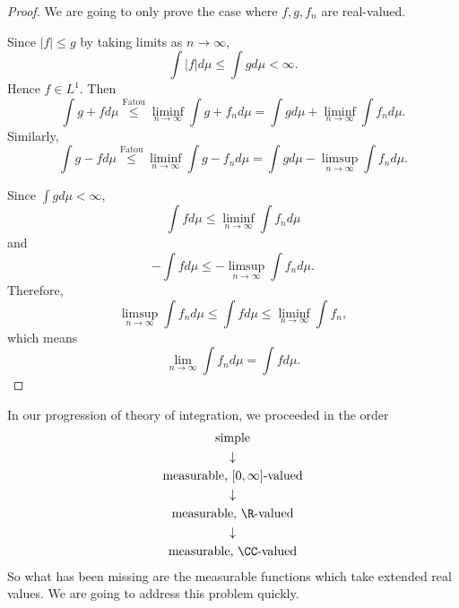 \documentclass[pmath451]{subfiles}
\begin{document}
    \begin{proof}
        We are going to only prove the case where $f,g,f_n$ are real-valued.

        Since $\left| f \right|\leq g$ by taking limits as $n\to\infty$,
        \begin{equation*}
            \int\left| f \right|d\mu\leq\int gd\mu < \infty.
        \end{equation*}
        Hence $f\in L^1$. Then
        \begin{equation*}
            \int g+fd\mu \overset{\text{Fatou}}{\leq} \liminf_{n\to\infty}\int g+f_nd\mu = \int gd\mu + \liminf_{n\to\infty}\int f_nd\mu.
        \end{equation*}
        Similarly,
        \begin{equation*}
            \int g-fd\mu \overset{\text{Fatou}}{\leq} \liminf_{n\to\infty}\int g-f_nd\mu = \int gd\mu - \limsup_{n\to\infty}\int f_nd\mu.
        \end{equation*}

        Since $\int gd\mu < \infty$,
        \begin{equation*}
            \int fd\mu \leq \liminf_{n\to\infty}\int f_nd\mu
        \end{equation*}
        and
        \begin{equation*}
            -\int fd\mu \leq - \limsup_{n\to\infty}\int f_nd\mu.
        \end{equation*}
        Therefore,
        \begin{equation*}
            \limsup_{n\to\infty}\int f_nd\mu \leq \int fd\mu \leq \liminf_{n\to\infty}\int f_n,
        \end{equation*}
        which means
        \begin{equation*}
            \lim_{n\to\infty}\int f_nd\mu = \int fd\mu.
        \end{equation*}
    \end{proof}

    \np In our progression of theory of integration, we proceeded in the order
    \begin{gather*}
        \text{simple} \\
        \downarrow\\
        \text{measurable, $\left[ 0,\infty \right]$-valued}\\
        \downarrow\\
        \text{measurable, $\R$-valued} \\
        \downarrow\\
        \text{measurable, $\CC$-valued}
    \end{gather*} 
    So what has been missing are the measurable functions which take extended real values. We are going to address this problem quickly.
\end{document}
